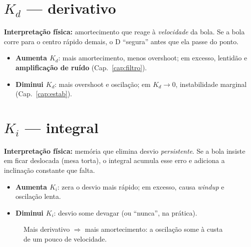 \section{$K_d$ --- derivativo}
\textbf{Interpreta\c{c}\~ao f\'isica:} amortecimento que reage \`a \emph{velocidade}
da bola. Se a bola corre para o centro r\'apido demais, o D ``segura'' antes que ela
passe do ponto.
\begin{itemize}[leftmargin=1.4em]
  \item \textbf{Aumenta $K_d$}: mais amortecimento, menos overshoot; em excesso,
  lentid\~ao e \textbf{amplifica\c{c}\~ao de ru\'ido} (Cap.~\ref{cap:filtro}).
  \item \textbf{Diminui $K_d$}: mais overshoot e oscila\c{c}\~ao; em $K_d\to0$,
  instabilidade marginal (Cap.~\ref{cap:estab}).
\end{itemize}

\section{$K_i$ --- integral}
\textbf{Interpreta\c{c}\~ao f\'isica:} mem\'oria que elimina desvio
\emph{persistente}. Se a bola insiste em ficar deslocada (mesa torta), o integral
acumula esse erro e adiciona a inclina\c{c}\~ao constante que falta.
\begin{itemize}[leftmargin=1.4em]
  \item \textbf{Aumenta $K_i$}: zera o desvio mais r\'apido; em excesso, causa
  \emph{windup} e oscila\c{c}\~ao lenta.
  \item \textbf{Diminui $K_i$}: desvio some devagar (ou ``nunca'', na pr\'atica).
\end{itemize}

\begin{figure}[h]\centering
{}
\caption{Mais derivativo $\Rightarrow$ mais amortecimento: a oscila\c{c}\~ao some \`a custa de um pouco de velocidade.}
\label{fig:kd}
\end{figure}

